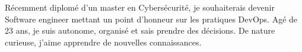 
\begin{cvparagraph}
    Récemment diplomé d'un master en Cybersécurité, je souhaiterais devenir Software engineer mettant un point d'honneur sur les pratiques DevOps. 
    Agé de 23 ans, je suis autonome, organisé et sais prendre des décisions. De nature curieuse, j'aime apprendre de nouvelles connaissances.
\end{cvparagraph}
